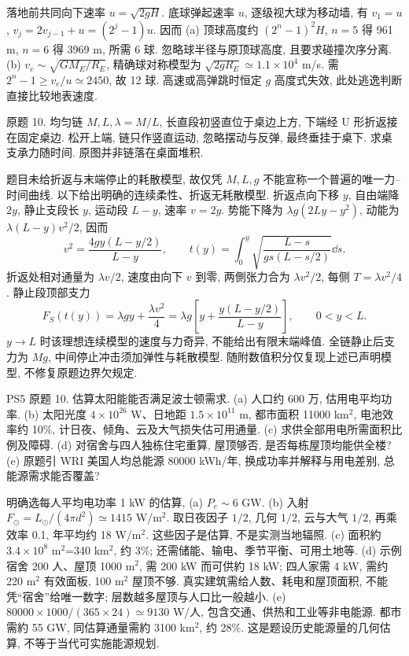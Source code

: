 \begin{solution}
落地前共同向下速率 $u=\sqrt{2gH}$. 底球弹起速率 $u$, 逐级视大球为移动墙, 有 $v_1=u$, $v_j=2v_{j-1}+u=(2^j-1)u$. 因而 (a) 顶球高度约 $(2^n-1)^2H$, $n=5$ 得 961 m, $n=6$ 得 3969 m, 所需 6 球. 忽略球半径与原顶球高度, 且要求碰撞次序分离. (b) $v_e\sim\sqrt{GM_E/R_E}$, 精确球对称模型为 $\sqrt{2gR_E}\simeq1.1\times10^4$ m/s. 需 $2^n-1\ge v_e/u\simeq2450$, 故 12 球. 高速或高弹跳时恒定 $g$ 高度式失效, 此处逃逸判断直接比较地表速度.
\end{solution}
\begin{exercise}
原题 10. 均匀链 $M,L,\lambda=M/L$, 长直段初竖直位于桌边上方, 下端经 U 形折返接在固定桌边. 松开上端, 链只作竖直运动, 忽略摆动与反弹, 最终垂挂于桌下. 求桌支承力随时间. 原图并非链落在桌面堆积.
\end{exercise}
\begin{solution}
题目未给折返与末端停止的耗散模型, 故仅凭 $M,L,g$ 不能宣称一个普遍的唯一力--时间曲线. 以下给出明确的连续柔性、折返无耗散模型. 折返点向下移 $y$, 自由端降 $2y$, 静止支段长 $y$, 运动段 $L-y$, 速率 $v=2\dot y$. 势能下降为 $\lambda g(2Ly-y^2)$, 动能为 $\lambda(L-y)v^2/2$, 因而
\begin{equation}
v^2=\frac{4gy(L-y/2)}{L-y},\qquad
 t(y)=\int_0^y\sqrt{\frac{L-s}{g s(L-s/2)}}\dd s.
\end{equation}
折返处相对通量为 $\lambda v/2$, 速度由向下 $v$ 到零, 两側张力合为 $\lambda v^2/2$, 每侧 $T=\lambda v^2/4$. 静止段顶部支力
\begin{equation}
F_S(t(y))=\lambda gy+\frac{\lambda v^2}{4}
=\lambda g\left[y+\frac{y(L-y/2)}{L-y}\right],\qquad0<y<L.
\end{equation}
$y\to L$ 时该理想连续模型的速度与力奇异, 不能给出有限末端峰值. 全链静止后支力为 $Mg$, 中间停止冲击须加弹性与耗散模型. 随附数值积分仅复现上述已声明模型, 不修复原题边界欠规定.
\end{solution}
\begin{exercise}
PS5 原题 10. 估算太阳能能否满足波士顿需求. (a) 人口约 600 万, 估用电平均功率. (b) 太阳光度 $4\times10^{26}$ W、日地距 $1.5\times10^{11}$ m, 都市面积 11000 km$^2$, 电池效率约 10\%, 计日夜、倾角、云及大气损失估可用通量. (c) 求供全部用电所需面积比例及障碍. (d) 对宿舍与四人独栋住宅重算, 屋顶够否, 是否每栋屋顶均能供全楼? (e) 原题引 WRI 美国人均总能源 80000 kWh/年, 换成功率并解释与用电差别, 总能源需求能否覆盖?
\end{exercise}
\begin{solution}
明确选每人平均电功率 1 kW 的估算, (a) $P_e\sim6$ GW. (b) 入射 $F_\odot=L_\odot/(4\pi d^2)\simeq1415$ W/m$^2$. 取日夜因子 $1/2$, 几何 $1/2$, 云与大气 $1/2$, 再乘效率 0.1, 年平均约 18 W/m$^2$. 这些因子是估算, 不是实测当地辐照. (c) 面积約 $3.4\times10^8$ m$^2$=340 km$^2$, 约 3\%; 还需储能、输电、季节平衡、可用土地等. (d) 示例宿舍 200 人、屋顶 1000 m$^2$, 需 200 kW 而可供約 18 kW; 四人家需 4 kW, 需约 220 m$^2$ 有效面板, 100 m$^2$ 屋顶不够. 真实建筑需给人数、耗电和屋顶面积, 不能凭“宿舍”给唯一数字; 层数越多屋顶与人口比一般越小. (e) $80000\times1000/(365\times24)\simeq9130$ W/人, 包含交通、供热和工业等非电能源. 都市需約 55 GW, 同估算通量需約 3100 km$^2$, 约 28\%. 这是题设历史能源量的几何估算, 不等于当代可实施能源规划.
\end{solution}
